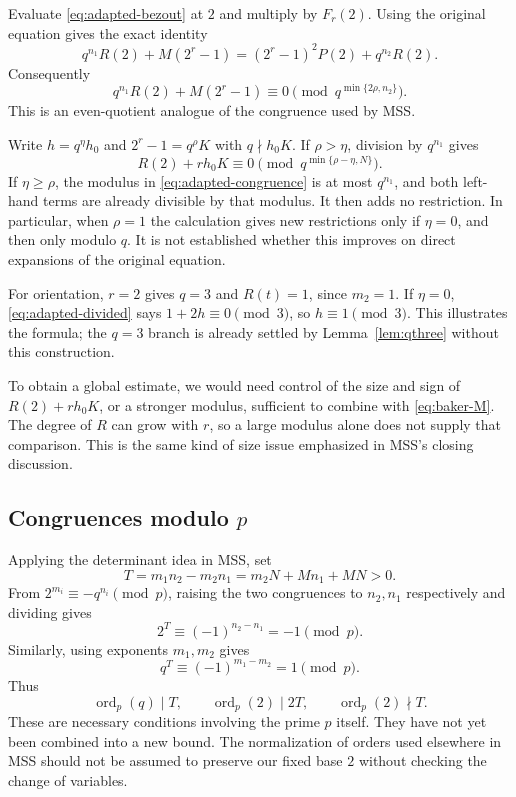 \documentclass[11pt]{article}
\begin{document}
Evaluate \eqref{eq:adapted-bezout} at $2$ and multiply by $F_r(2)$.
Using the original equation gives the exact identity
\[
q^{n_1}R(2)+M(2^r-1)
=(2^r-1)^2P(2)+q^{n_2}R(2).
\]
Consequently
\begin{equation}\label{eq:adapted-congruence}
\boxed{
q^{n_1}R(2)+M(2^r-1)
\equiv0\pmod{q^{\min\{2\rho,n_2\}}}.}
\end{equation}
This is an even-quotient analogue of the congruence used by MSS.

Write $h=q^\eta h_0$ and $2^r-1=q^\rho K$ with $q\nmid h_0K$.
If $\rho>\eta$, division by $q^{n_1}$ gives
\begin{equation}\label{eq:adapted-divided}
\boxed{R(2)+r h_0K\equiv0\pmod{q^{\min\{\rho-\eta,N\}}}.}
\end{equation}
If $\eta\geq\rho$, the modulus in
\eqref{eq:adapted-congruence} is at most $q^{n_1}$, and both left-hand
terms are already divisible by that modulus. It then adds no restriction.
In particular, when $\rho=1$ the calculation gives new restrictions
only if $\eta=0$, and then only modulo $q$.
It is not established whether this improves on direct expansions of the
original equation.

For orientation, $r=2$ gives $q=3$ and $R(t)=1$, since $m_2=1$.
If $\eta=0$, \eqref{eq:adapted-divided} says $1+2h\equiv0\pmod3$,
so $h\equiv1\pmod3$. This illustrates the formula; the $q=3$ branch is already settled by
Lemma~\ref{lem:qthree} without this construction.

To obtain a global estimate, we would need control of the size and sign of $R(2)+r h_0K$, or a
stronger modulus, sufficient to combine with \eqref{eq:baker-M}.
The degree of $R$ can grow with $r$, so a large modulus alone does not
supply that comparison. This is the same kind of size issue emphasized
in MSS's closing discussion.

\subsection{\texorpdfstring{Congruences modulo $p$}{Congruences modulo p}}

Applying the determinant idea in MSS, set
\[
T=m_1n_2-m_2n_1=m_2N+Mn_1+MN>0.
\]
From $2^{m_i}\equiv-q^{n_i}\pmod p$, raising the two congruences
to $n_2,n_1$ respectively and dividing gives
\[
2^T\equiv(-1)^{n_2-n_1}=-1\pmod p.
\]
Similarly, using exponents $m_1,m_2$ gives
\[
q^T\equiv(-1)^{m_1-m_2}=1\pmod p.
\]
Thus
\[
\operatorname{ord}_p(q)\mid T,\qquad
\operatorname{ord}_p(2)\mid2T,\qquad
\operatorname{ord}_p(2)\nmid T.
\]
These are necessary conditions involving the prime $p$ itself.
They have not yet been combined into a new bound.
The normalization of orders used elsewhere in MSS should not be assumed
to preserve our fixed base $2$ without checking the change of variables.

{}


\end{document}
